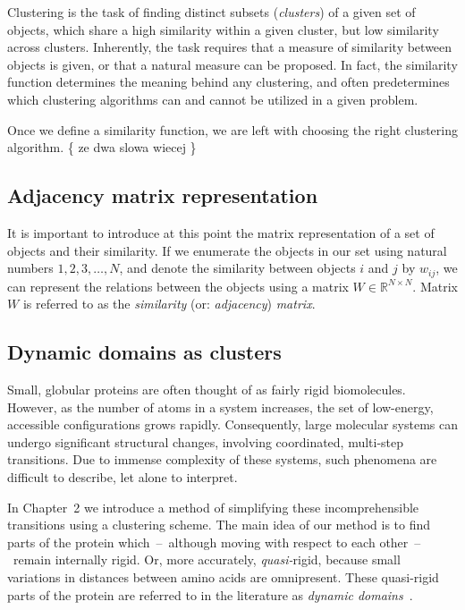 \documentclass[a4paper,11pt,twoside]{book}%
\begin{document}
Clustering is the task of finding distinct subsets (\emph{clusters}) of a given set of objects, which share a high similarity within a given cluster, but low similarity across clusters.
Inherently, the task requires that a measure of similarity between objects is given, or that a natural measure can be proposed.
In fact, the similarity function determines the meaning behind any clustering, and often predetermines which clustering algorithms can and cannot be utilized in a given problem.

Once we define a similarity function, we are left with choosing the right clustering algorithm.
\{ ze dwa slowa wiecej \}


\subsection{Adjacency matrix representation}\label{sec:matrixRepresentation}

It is important to introduce at this point the matrix representation of a set of objects and their similarity.
If we enumerate the objects in our set using natural numbers $1,2,3,\ldots,N$, and denote the similarity between objects $i$ and $j$ by $w_{ij}$, we can represent the relations between the objects using a matrix $W\in\mathbb{R}^{N\times N}$.
Matrix $W$ is referred to as the \emph{similarity} (or: \emph{adjacency}) \emph{matrix}.

\subsection{Dynamic domains as clusters}

Small, globular proteins are often thought of as fairly rigid biomolecules.
However, as the number of atoms in a system increases, the set of low-energy, accessible configurations grows rapidly.
Consequently, large molecular systems can undergo significant structural changes, involving coordinated, multi-step transitions.
Due to immense complexity of these systems, such phenomena are difficult to describe, let alone to interpret.

In Chapter~2 we introduce a method of simplifying these incomprehensible transitions using a clustering scheme.
The main idea of our method is to find parts of the protein which~--~although moving with respect to each other~--~remain internally rigid.
Or, more accurately, \emph{quasi-}rigid, because small variations in distances between amino acids are omnipresent.
These quasi-rigid parts of the protein are referred to in the literature as \emph{dynamic domains}~\cite{bahar1997direct,hayward1998systematic,hinsen1998analysis}.
\end{document}
